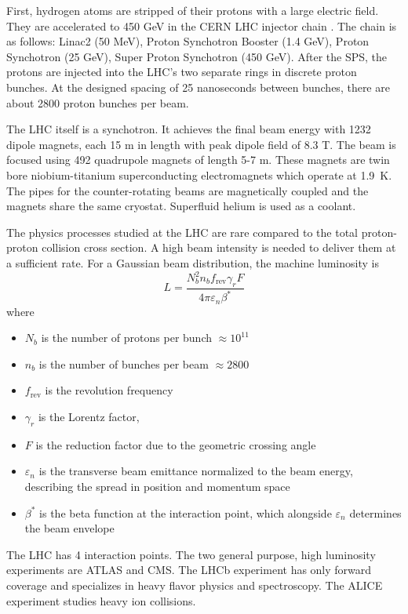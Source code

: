 First, hydrogen atoms are stripped of their protons with a large electric field.
They are accelerated to 450 GeV in the CERN LHC injector chain \cite{lhcinjector}.
The chain is as follows: Linac2 (50 MeV), Proton Synchotron Booster (1.4 GeV), Proton Synchotron (25 GeV), Super Proton Synchotron (450 GeV).
After the SPS, the protons are injected into the LHC's two separate rings in discrete proton bunches.
At the designed spacing of 25 nanoseconds between bunches, there are about 2800 proton bunches per beam.

The LHC itself is a synchotron. 
It achieves the final beam energy with 1232 dipole magnets, each 15 m in length with peak dipole field of 8.3 T.
The beam is focused using 492 quadrupole magnets of length 5-7 m.
These magnets are twin bore niobium-titanium superconducting electromagnets which operate at 1.9\textdegree~K.
The pipes for the counter-rotating beams are magnetically coupled and the magnets share the same cryostat.
Superfluid helium is used as a coolant.

The physics processes studied at the LHC are rare compared to the total proton-proton collision cross section.
A high beam intensity is needed to deliver them at a sufficient rate.
For a Gaussian beam distribution, the machine luminosity is
\begin{equation}
L = \frac{N_b^2 n_b f_\mathrm{rev} \gamma_r F}{4\pi\varepsilon_n \beta^*}
\end{equation}
where
\begin{itemize}
\item $N_b$ is the number of protons per bunch $\approx 10^{11}$
\item $n_b$ is the number of bunches per beam $\approx 2800$
\item $f_\mathrm{rev}$ is the revolution frequency 
\item $\gamma_r$ is the Lorentz factor,
\item $F$ is the reduction factor due to the geometric crossing angle
\item $\varepsilon_n$ is the transverse beam emittance normalized to the beam energy, describing the spread in position and momentum space
\item $\beta^*$ is the beta function at the interaction point, which alongside $\varepsilon_n$ determines the beam envelope
\end{itemize}

The LHC has 4 interaction points. The two general purpose, high luminosity experiments are ATLAS and CMS.
The LHCb experiment has only forward coverage and specializes in heavy flavor physics and spectroscopy.
The ALICE experiment studies heavy ion collisions.

